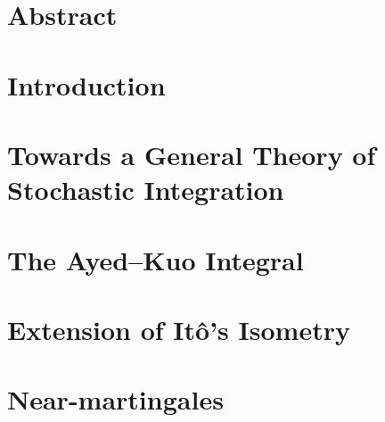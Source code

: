 \documentclass[singlespacing]{lsuthesis}
\numberwithin{equation}{section}
\theoremstyle{plain}
\theoremstyle{definition}
\theoremstyle{remark}
\begin{document}



\chapter{Abstract}




\mainmatter

\chapter{Introduction}
\label{chp:introduction}


\chapter{Towards a General Theory of Stochastic Integration}
\label{chp:extensions}


\chapter{The Ayed–Kuo Integral}
\label{chp:Ayed–Kuo_integral}


\chapter{Extension of Itô's Isometry}
\label{chp:isometry}


\chapter{Near-martingales}
\label{chp:near-martingales}

\end{document}
